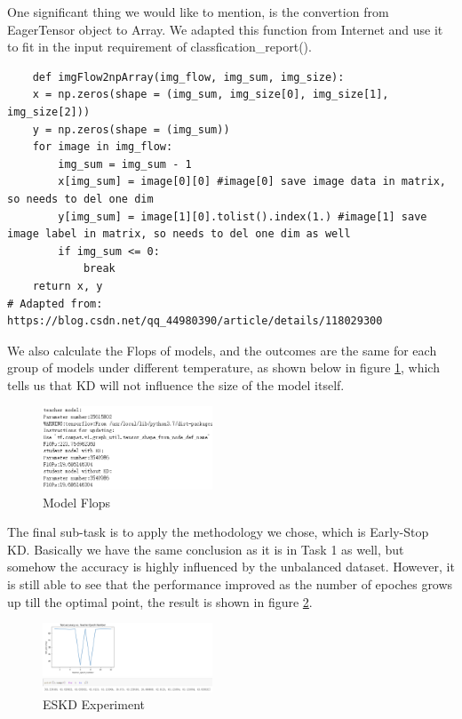 \documentclass[conference]{IEEEtran}
\begin{document}
One significant thing we would like to mention, is the convertion from EagerTensor object to Array. We adapted this function from Internet and use it to fit in the input requirement of classfication\_report().

\begin{lstlisting}
	def imgFlow2npArray(img_flow, img_sum, img_size):
    x = np.zeros(shape = (img_sum, img_size[0], img_size[1], img_size[2]))
    y = np.zeros(shape = (img_sum))
    for image in img_flow:
        img_sum = img_sum - 1
        x[img_sum] = image[0][0] #image[0] save image data in matrix, so needs to del one dim
        y[img_sum] = image[1][0].tolist().index(1.) #image[1] save image label in matrix, so needs to del one dim as well
        if img_sum <= 0:
            break
    return x, y
# Adapted from: https://blog.csdn.net/qq_44980390/article/details/118029300
\end{lstlisting}

We also calculate the Flops of models, and the outcomes are the same for each group of models under different temperature, as shown below in figure \ref{flops2}, which tells us that KD will not influence the size of the model itself.

\begin{figure}[hbtp] 
    \centering
    \includegraphics[width=0.45\textwidth]{./graphs/Task2/flops.png}
    \caption{Model Flops}
    \label{flops2}
\end{figure}

The final sub-task is to apply the methodology we chose, which is Early-Stop KD. Basically we have the same conclusion as it is in Task 1 as well, but somehow the accuracy is highly influenced by the unbalanced dataset. However, it is still able to see that the performance improved as the number of epoches grows up till the optimal point, the result is shown in figure \ref{es}.

\begin{figure}[hbtp] 
    \centering
    \includegraphics[width=0.45\textwidth]{./graphs/Task2/es.png}
    \caption{ESKD Experiment}
    \label{es}
\end{figure}
\end{document}
